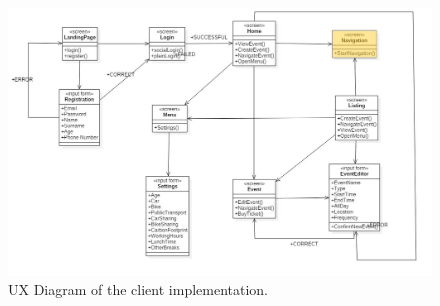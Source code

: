 \begin{figure}
	\centering
	\includegraphics[width=6in]{./diagrams/GeneralUxDiagram.jpg}
	\caption{UX Diagram of the client implementation.}
	\label{fig:generaluxdiag}
\end{figure}
